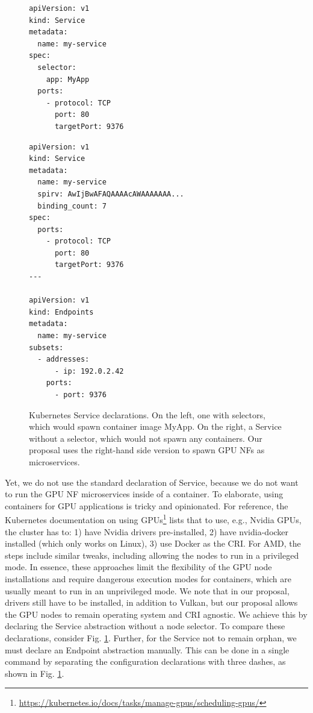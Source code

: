 \documentclass{IEEEtran}
\begin{document}
\begin{figure}
\begin{minipage}[t]{0.45\columnwidth}
\begin{lstlisting}
apiVersion: v1
kind: Service
metadata:
  name: my-service
spec:
  selector:
    app: MyApp
  ports:
    - protocol: TCP
      port: 80
      targetPort: 9376
\end{lstlisting}
\end{minipage}
\begin{minipage}[t]{0.45\columnwidth}
\begin{lstlisting}
apiVersion: v1
kind: Service
metadata:
  name: my-service
  spirv: AwIjBwAFAQAAAAcAWAAAAAAA...
  binding_count: 7
spec:
  ports:
    - protocol: TCP
      port: 80
      targetPort: 9376
---

apiVersion: v1
kind: Endpoints
metadata:
  name: my-service
subsets:
  - addresses:
      - ip: 192.0.2.42
    ports:
      - port: 9376
\end{lstlisting}
\end{minipage}
\caption{Kubernetes Service declarations. On the left, one with selectors, which would spawn container image MyApp. On the right, a Service without a selector, which would not spawn any containers. Our proposal uses the right-hand side version to spawn GPU NFs as microservices.}
\label{fig:svc}
\end{figure}

Yet, we do not use the standard declaration of Service, because we do not want to run the GPU NF microservices inside of a container. To elaborate, using containers for GPU applications is tricky and opinionated. For reference, the Kubernetes documentation on using GPUs\footnote{\url{https://kubernetes.io/docs/tasks/manage-gpus/scheduling-gpus/}} lists that to use, e.g., Nvidia GPUs, the cluster has to: 1) have Nvidia drivers pre-installed, 2) have nvidia-docker installed (which only works on Linux), 3) use Docker as the CRI. For AMD, the steps include similar tweaks, including allowing the nodes to run in a privileged mode. In essence, these approaches limit the flexibility of the GPU node installations and require dangerous execution modes for containers, which are usually meant to run in an unprivileged mode. We note that in our proposal, drivers still have to be installed, in addition to Vulkan, but our proposal allows the GPU nodes to remain operating system and CRI agnostic. We achieve this by declaring the Service abstraction without a node selector. To compare these declarations, consider Fig. \ref{fig:svc}. Further, for the Service not to remain orphan, we must declare an Endpoint abstraction manually. This can be done in a single command by separating the configuration declarations with three dashes, as shown in Fig. \ref{fig:svc}.
\end{document}

